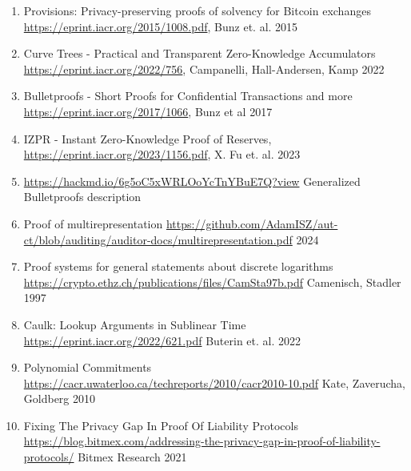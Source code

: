 \documentclass[10pt,a4paper]{article}
\providecommand{\tightlist}{%
  \setlength{\itemsep}{0pt}\setlength{\parskip}{0pt}}
\begin{document}
\begin{enumerate}
\def\labelenumi{\arabic{enumi}.}
\tightlist
\item
  \protect\hypertarget{anchor-1}{}{}Provisions: Privacy-preserving proofs of solvency for Bitcoin exchanges
  \url{https://eprint.iacr.org/2015/1008.pdf}, Bunz et. al. 2015
\item
  \protect\hypertarget{anchor-2}{}{}Curve Trees - Practical and Transparent Zero-Knowledge Accumulators
  \url{https://eprint.iacr.org/2022/756}, Campanelli, Hall-Andersen, Kamp 2022
 \item
  \protect\hypertarget{anchor-3}{}{}Bulletproofs - Short Proofs for Confidential Transactions and more
  \url{https://eprint.iacr.org/2017/1066}, Bunz et al 2017
\item
  \protect\hypertarget{anchor-4}{}{}IZPR - Instant Zero-Knowledge Proof of Reserves,
  \url{https://eprint.iacr.org/2023/1156.pdf}, X. Fu et. al. 2023
 \item
 \protect\hypertarget{anchor-5}{}{} \url{https://hackmd.io/6g5oC5xWRLOoYcTnYBuE7Q?view} Generalized Bulletproofs description
\item
  \protect\hypertarget{anchor-6}{}{} Proof of multirepresentation
  \url{https://github.com/AdamISZ/aut-ct/blob/auditing/auditor-docs/multirepresentation.pdf} 2024
\item
  \protect\hypertarget{anchor-7}{}{} Proof systems for general statements about discrete logarithms
  \url{https://crypto.ethz.ch/publications/files/CamSta97b.pdf} Camenisch, Stadler 1997
 \item
  \protect\hypertarget{anchor-8}{}{} Caulk: Lookup Arguments in Sublinear Time
  \url{https://eprint.iacr.org/2022/621.pdf} Buterin et. al. 2022
 \item
 \protect\hypertarget{anchor-9}{}{} Polynomial Commitments
 \url{https://cacr.uwaterloo.ca/techreports/2010/cacr2010-10.pdf} Kate, Zaverucha, Goldberg 2010
 \item
 \protect\hypertarget{anchor-10}{}{} Fixing The Privacy Gap In Proof Of Liability Protocols \url{https://blog.bitmex.com/addressing-the-privacy-gap-in-proof-of-liability-protocols/} Bitmex Research 2021
\end{enumerate}
\end{document}
